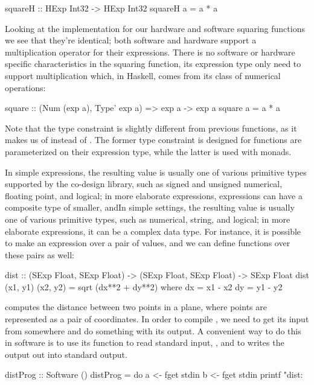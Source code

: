 \begin{stub}
squareH :: HExp Int32 -> HExp Int32
squareH a = a * a
\end{stub}

Looking at the implementation for our hardware and software squaring functions we see that they're identical; both software and hardware support a multiplication operator for their expressions. There is no software or hardware specific characteristics in the squaring function, its expression type only need to support multiplication which, in Haskell, comes from its  class of numerical operations:

\begin{code}
square :: (Num (exp a), Type' exp a) => exp a -> exp a
square a = a * a
\end{code}

\noindent Note that the type constraint is slightly different from previous functions, as it makes us of  instead of . The former type constraint is designed for functions are parameterized on their expression type, while the latter is used with monads.

In simple expressions, the resulting value is usually one of various primitive types supported by the co-design library, such as signed and unsigned numerical, floating point, and logical; in more elaborate expressions, expressions can have a composite type of smaller, andIn simple settings, the resulting value is usually one of various primitive types, such as numerical, string, and logical; in more elaborate expressions, it can be a complex data type. For instance, it is possible to make an expression over a pair of values, and we can define functions over these pairs as well:

\begin{code}
dist :: (SExp Float, SExp Float) -> (SExp Float, SExp Float) -> SExp Float
dist (x1, y1) (x2, y2) = sqrt (dx**2 + dy**2)
  where
    dx = x1 - x2
    dy = y1 - y2
\end{code}

\noindent {} computes the distance between two points in a plane, where points are represented as a pair of coordinates. In order to compile , we need to get its input from somewhere and do something with its output. A convenient way to do this in software is to use its  function to read standard input, , and  to writes the output out into standard output.

\begin{code}
distProg :: Software ()
distProg = do
  a <- fget stdin
  b <- fget stdin
  printf "dist: %
\end{code}

